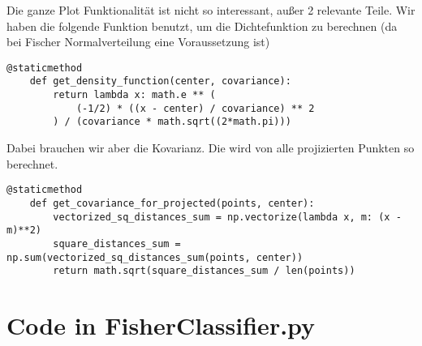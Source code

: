 Die ganze Plot Funktionalität ist nicht so interessant, außer 2 relevante Teile. Wir haben die folgende Funktion
benutzt, um die Dichtefunktion zu berechnen (da bei Fischer Normalverteilung eine Voraussetzung ist)

\begin{lstlisting}[style=py]
@staticmethod
    def get_density_function(center, covariance):
        return lambda x: math.e ** (
            (-1/2) * ((x - center) / covariance) ** 2
        ) / (covariance * math.sqrt((2*math.pi)))
\end{lstlisting}

Dabei brauchen wir aber die Kovarianz. Die wird von alle projizierten Punkten so berechnet.

\begin{lstlisting}[style=py]
@staticmethod
    def get_covariance_for_projected(points, center):
        vectorized_sq_distances_sum = np.vectorize(lambda x, m: (x - m)**2)
        square_distances_sum = np.sum(vectorized_sq_distances_sum(points, center))
        return math.sqrt(square_distances_sum / len(points))
\end{lstlisting}

\section*{Code in FisherClassifier.py}

